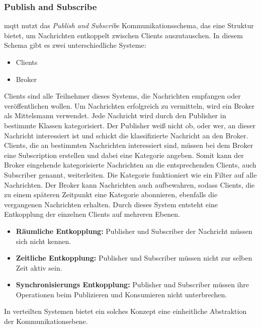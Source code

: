 \subsubsection{Publish and Subscribe} \label{s:publish-subscribe}
\ac{mqtt} nutzt das \textit{Publish and Subscribe} Kommunikationsschema, das eine Struktur bietet, um Nachrichten entkoppelt zwischen Clients auszutauschen. In diesem Schema gibt es zwei unterschiedliche Systeme:
\begin{itemize}
    \item Clients
    \item Broker
\end{itemize}
Clients sind alle Teilnehmer dieses Systems, die Nachrichten empfangen oder veröffentlichen wollen. Um Nachrichten erfolgreich zu vermitteln, wird ein Broker als Mittelsmann verwendet.\cite{teamGettingStartedMQTT}
Jede Nachricht wird durch den Publisher in bestimmte Klassen kategorisiert. Der Publisher wei{\ss} nicht ob, oder wer, an dieser Nachricht interessiert ist und schickt die klassifizierte Nachricht an den Broker.
Clients, die an bestimmten Nachrichten interessiert sind, müssen bei dem Broker eine Subscription erstellen und dabei eine Kategorie angeben.
Somit kann der Broker eingehende kategorisierte Nachrichten an die entsprechenden Clients, auch Subscriber genannt, weiterleiten. Die Kategorie funktioniert wie ein Filter auf alle Nachrichten.
Der Broker kann Nachrichten auch aufbewahren, sodass Clients, die zu einem späteren Zeitpunkt eine Kategorie abonnieren, ebenfalls die vergangenen Nachrichten erhalten.
\cite{EverythingYouNeed}
Durch dieses System entsteht eine Entkopplung der einzelnen Clients auf mehreren Ebenen.
\begin{itemize}
    \item \textbf{Räumliche Entkopplung:} Publisher und Subscriber der Nachricht müssen sich nicht kennen.
      \cite{teamPublishSubscribeMQTT}
    \item \textbf{Zeitliche Entkopplung:} Publisher und Subscriber müssen nicht zur selben Zeit aktiv sein.
      \cite{teamPublishSubscribeMQTT}
    \item \textbf{Synchronisierungs Entkopplung:} Publisher und Subscriber müssen ihre Operationen beim Publizieren und Konsumieren nicht unterbrechen.
      \cite{teamPublishSubscribeMQTT}
\end{itemize}
In verteilten Systemen bietet ein solches Konzept eine einheitliche Abstraktion der Kommunikationsebene.
\cite{domingusDistributedSystemsIntroduction2020}
